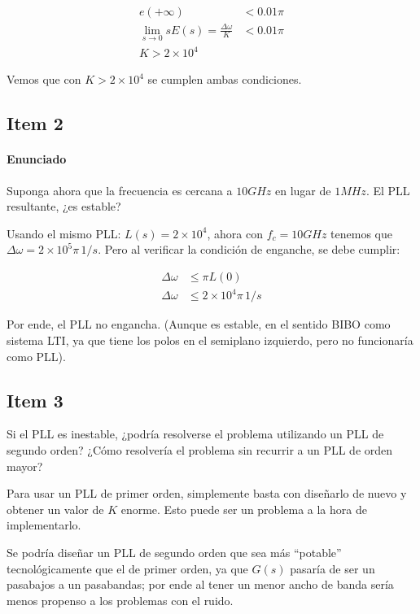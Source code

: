 \begin{align*}
e(+\infty) &< 0.01 \pi\\
\lim\limits_{s\to 0} sE(s) = \frac{\Delta \omega}{K} &< 0.01 \pi\\
K > 2\times 10^4
\end{align*}

Vemos que con $K > 2\times 10^4$ se cumplen ambas condiciones.

\subsection{Item 2}
\paragraph{Enunciado} Suponga ahora que la frecuencia es cercana a $10GHz$ en lugar de $1MHz$. El PLL resultante, ¿es estable?

Usando el mismo PLL: $L(s) = 2\times 10^4$, ahora con $f_c = 10GHz$ tenemos que $\Delta \omega = 2\times 10^5 \pi\, 1/s$. Pero al verificar la condición de enganche, se debe cumplir:

\begin{align*}
\Delta \omega &\le \pi L(0)\\
\Delta \omega &\le 2\times 10^4 \pi\, 1/s
\end{align*}

Por ende, el PLL no engancha. (Aunque es estable, en el sentido BIBO como sistema LTI, ya que tiene los polos en el semiplano izquierdo, pero no funcionaría como PLL).

\subsection{Item 3}
 Si el PLL es inestable, ¿podría resolverse el problema utilizando un PLL de segundo orden? ¿Cómo resolvería el problema sin recurrir a un PLL de orden mayor?
 
 Para usar un PLL de primer orden, simplemente basta con diseñarlo de nuevo y obtener un valor de $K$ enorme. Esto puede ser un problema a la hora de implementarlo.
 
 Se podría diseñar un PLL de segundo orden que sea más ``potable'' tecnológicamente que el de primer orden, ya que $G(s)$ pasaría de ser un pasabajos a un pasabandas; por ende al tener un menor ancho de banda sería menos propenso a los problemas con el ruido.